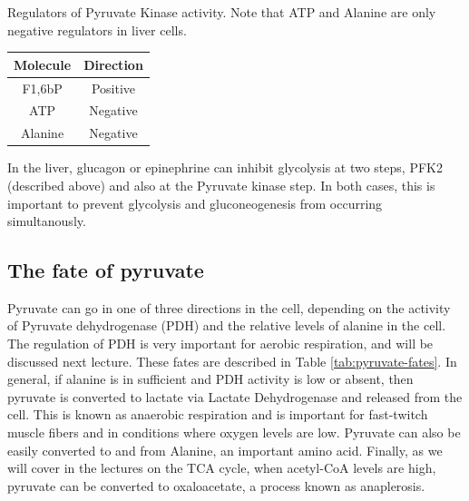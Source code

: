 \documentclass{tufte-handout}
\begin{document}
\begin{margintable}
\centering
\caption{Regulators of Pyruvate Kinase activity.  Note that ATP and Alanine are only negative regulators in liver cells.}
\label{tab:pk-regulators}
\begin{tabular}{cc}
\hline
\textbf {Molecule} & \textbf{Direction}  \\
\hline
F1,6bP & Positive \\
ATP & Negative \\
Alanine & Negative \\
\hline
\end{tabular}
\end{margintable}

  In the liver, glucagon or epinephrine can inhibit glycolysis at two steps, PFK2 (described above) and also at the Pyruvate kinase step.  In both cases, this is important to prevent glycolysis and gluconeogenesis from occurring simultanously.

\subsection{The fate of pyruvate}

Pyruvate can go in one of three directions in the cell, depending on the activity of Pyruvate dehydrogenase (PDH) and the relative levels of alanine in the cell.  The regulation of PDH is very important for aerobic respiration, and will be discussed next lecture.  These fates are described in Table \ref{tab:pyruvate-fates}.  In general, if alanine is in sufficient and PDH activity is low or absent, then pyruvate is converted to lactate via Lactate Dehydrogenase and released from the cell.  This is known as anaerobic respiration and is important for fast-twitch muscle fibers and in conditions where oxygen levels are low.  Pyruvate can also be easily converted to and from Alanine, an important amino acid.  Finally, as we will cover in the lectures on the TCA cycle, when acetyl-CoA levels are high, pyruvate can be converted to oxaloacetate, a process known as anaplerosis.
\end{document}

